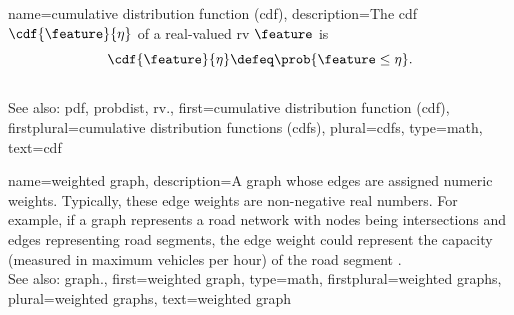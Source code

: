 {name={cumulative distribution function (cdf)},
	description={The  cdf 
	$\cdf{\feature}{\eta}$ of a real-valued \gls{rv} $\feature$ is \cite{AshProbMeasure,papoulis}
	$$\cdf{\feature}{\eta} \defeq \prob{\feature \leq \eta}.$$
					\\ 
		See also: \gls{pdf}, \gls{probdist}, \gls{rv}.},
	first={cumulative distribution function (cdf)},
	firstplural={cumulative distribution functions (cdfs)}, 
	plural={cdfs}, 
	type=math,
	text={cdf} 
}

{name={weighted graph},
	description={A \gls{graph} whose edges 
	are assigned numeric weights. Typically, these edge weights 
	are non-negative real numbers. For example, if a graph represents 
	a road network with nodes being intersections and edges representing 
	road segments, the edge weight could represent the capacity (measured 
	in maximum vehicles per hour) of the road segment \cite{NewmannBook}.  
					\\ 
		See also: \gls{graph}.},
	first={weighted graph},
	type=math,
	firstplural={weighted graphs}, 
	plural={weighted graphs}, 
	text={weighted graph} 
}



